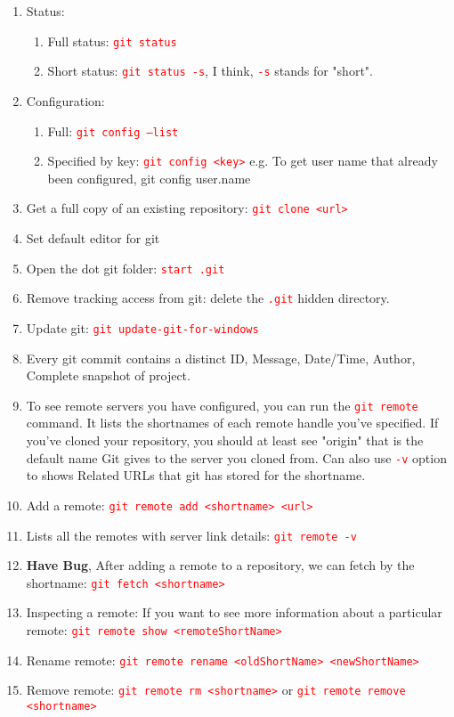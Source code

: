 \documentclass[10 pt]{article}
\newcommand{\R}{\textcolor{red}} %
\newcommand{\T}{\texttt}
\begin{document}
\begin{enumerate}
	\item Status:
		\begin{enumerate}
			\item Full status: \R{\T{git status}}
			\item Short status: \R{\T{git status -s}}, I think, \R{\T{-s}} stands for "short".
		\end{enumerate}
	\item Configuration:
		\begin{enumerate}
			\item Full: \R{\T{git config --list}}
			\item Specified by key: \R{\T{git config <key>}} e.g. To get user name that already been configured, \textcolor{red!70}{{git config user.name}}
		\end{enumerate}
	\item Get a full copy of an existing repository: \R{\T{git clone <url>}}
	
	\item Set default editor for git
	\item Open the dot git folder: \R{\T{start .git}}
	\item Remove tracking access from git: delete the \R{\T{.git}} hidden directory.
	
	\item Update git: \R{\T{git update-git-for-windows}}
	\item Every git commit contains a distinct ID, Message, Date/Time, Author, Complete snapshot of project.
	
	\item To see remote servers you have configured, you can run the \R{\T{git remote}} command. It lists the shortnames of each remote handle you've specified. If you've cloned your repository, you should at least see "origin" that is the default name Git gives to the server you cloned from. Can also use \R{\T{-v}} option to shows Related URLs that git has stored for the shortname.
	\item Add a remote: \R{\T{git remote add <shortname> <url>}}
	\item Lists all the remotes with server link details: \R{\T{git remote -v}}
	\item \textbf{Have Bug}, After adding a remote to a repository, we can fetch by the shortname: \R{\T{git fetch <shortname>}}
	\item Inspecting a remote: If you want to see more information about a particular remote: \R{\T{git remote show <remoteShortName>}}
	\item Rename remote: \R{\T{git remote rename <oldShortName> <newShortName>}}
	\item Remove remote: \R{\T{git remote rm <shortname>}} or \R{\T{git remote remove <shortname>}}
\end{enumerate}
\end{document}
